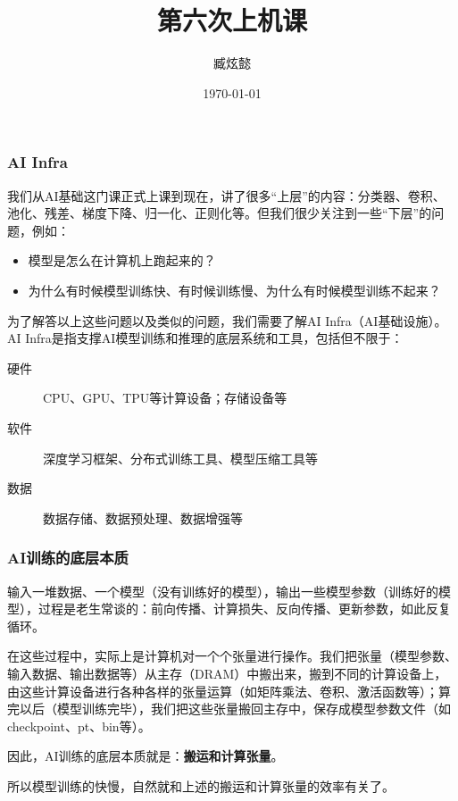 \documentclass{ctexbeamer}
\title{第六次上机课}
\author{臧炫懿}
\date{\today}
\begin{document}
\frame{\maketitle}

\begin{frame}
    \frametitle{AI Infra}

    我们从AI基础这门课正式上课到现在，讲了很多“上层”的内容：分类器、卷积、池化、残差、梯度下降、归一化、正则化等。但我们很少关注到一些“下层”的问题，例如：
    \begin{itemize}
        \item 模型是怎么在计算机上跑起来的？
        \item 为什么有时候模型训练快、有时候训练慢、为什么有时候模型训练不起来？
    \end{itemize}

    为了解答以上这些问题以及类似的问题，我们需要了解AI Infra（AI基础设施）。AI Infra是指支撑AI模型训练和推理的底层系统和工具，包括但不限于：
    \begin{description}
        \item[硬件] CPU、GPU、TPU等计算设备；存储设备等
        \item[软件] 深度学习框架、分布式训练工具、模型压缩工具等
        \item[数据] 数据存储、数据预处理、数据增强等
    \end{description}

\end{frame}

\begin{frame}
    \frametitle{AI训练的底层本质}

    输入一堆数据、一个模型（没有训练好的模型），输出一些模型参数（训练好的模型），过程是老生常谈的：前向传播、计算损失、反向传播、更新参数，如此反复循环。

    在这些过程中，实际上是计算机对一个个张量进行操作。我们把张量（模型参数、输入数据、输出数据等）从主存（DRAM）中搬出来，搬到不同的计算设备上，由这些计算设备进行各种各样的张量运算（如矩阵乘法、卷积、激活函数等）；算完以后（模型训练完毕），我们把这些张量搬回主存中，保存成模型参数文件（如checkpoint、pt、bin等）。
    
    \alert{因此，AI训练的底层本质就是：\textbf{搬运和计算张量}。}

    所以模型训练的快慢，自然就和上述的搬运和计算张量的效率有关了。

\end{frame}
\end{document}
